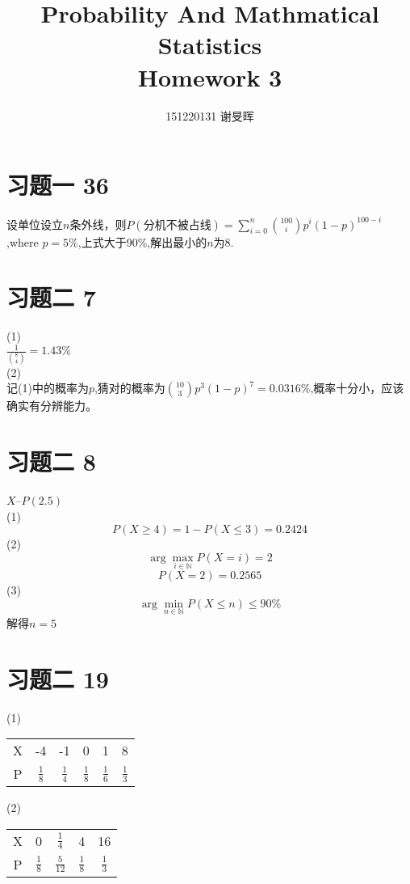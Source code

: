 \documentclass[a4paper,twocolumn]{ctexart}
\title{Probability And Mathmatical Statistics\\Homework 3}
\author{151220131 谢旻晖}
\date{}
\begin{document}
\maketitle
\section*{习题一 36}
设单位设立$n$条外线，则$P(\text{分机不被占线})=\sum_{i=0}^{n}\binom{100}{i}p^i(1-p)^{100-i}$,where $p=5\%$,上式大于90\%,解出最小的$n$为8.
\section*{习题二 7}
\noindent(1)\\
\indent $\frac{1}{\binom{8}{4}}=1.43\%$\\
\noindent (2)\\
\indent 记(1)中的概率为$p$,猜对的概率为$\binom{10}{3}p^3(1-p)^{7}=0.0316\%$,概率十分小，应该确实有分辨能力。
\section*{习题二 8}
$X$--$P(2.5)$\\
\noindent(1)\\
\[
P(X\ge4)=1-P(X\le3)=0.2424
\]
\noindent(2)\\
\[
\arg \max_{i\in \mathbb{N}}P(X=i)=2
\]
\[
P(X=2)=0.2565
\]
\noindent(3)\\
\[
\arg \min_{n\in \mathbb{N}}P(X\le n)\le 90\%
\]
\indent 解得$n=5$
\section*{习题二 19}
\noindent(1)\\
\begin{center}
\begin{tabular}{cccccc}
\hline
\hline
X&-4&-1&0&1&8\\
P&$\frac{1}{8}$&$\frac{1}{4}$&$\frac{1}{8}$&$\frac{1}{6}$&$\frac{1}{3}$\\
\hline
\end{tabular}
\end{center}

\noindent(2)\\
\begin{center}
	\begin{tabular}{ccccc}
		\hline
		\hline
		X&0&$\frac{1}{4}$&4&16\\
		P&$\frac{1}{8}$&$\frac{5}{12}$&$\frac{1}{8}$&$\frac{1}{3}$\\
		\hline
	\end{tabular}
\end{center}
\end{document}
